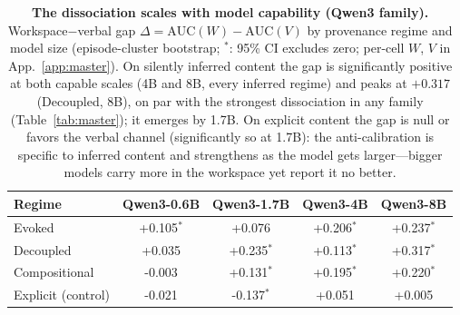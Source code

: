 \begin{table}[t]
\centering
\caption{\textbf{The dissociation scales with model capability (Qwen3 family).}
Workspace$-$verbal gap $\Delta{=}\mathrm{AUC}(W){-}\mathrm{AUC}(V)$ by
provenance regime and model size (episode-cluster bootstrap; $^{*}$: 95\% CI
excludes zero; per-cell $W$, $V$ in App.~\ref{app:master}). On
silently inferred content the gap is significantly positive at both capable
scales (4B and 8B, every inferred regime) and peaks at $+0.317$ (Decoupled,
8B), on par with the strongest dissociation in any family
(Table~\ref{tab:master}); it emerges by 1.7B. On explicit content the gap is null or favors the
verbal channel (significantly so at 1.7B): the anti-calibration is specific to
inferred content and strengthens as the model gets larger---bigger models
carry more in the workspace yet report it no better.}
\label{tab:q3scale}
\small
\begin{tabular}{lcccc}
\toprule
Regime & Qwen3-0.6B & Qwen3-1.7B & Qwen3-4B & Qwen3-8B \\
\midrule
Evoked & +0.105$^{*}$ & +0.076 & +0.206$^{*}$ & +0.237$^{*}$ \\
Decoupled & +0.035 & +0.235$^{*}$ & +0.113$^{*}$ & +0.317$^{*}$ \\
Compositional & -0.003 & +0.131$^{*}$ & +0.195$^{*}$ & +0.220$^{*}$ \\
\addlinespace
Explicit (control) & -0.021 & -0.137$^{*}$ & +0.051 & +0.005 \\
\bottomrule
\end{tabular}
\end{table}
